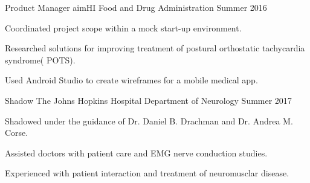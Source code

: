 

\begin{cventries}

  \cventry
    {Product Manager} %
    {aimHI} %
    {Food and Drug Administration} %
    {Summer 2016} %
    {
      \begin{cvitems} %
        \item {Coordinated project scope within a mock start-up environment.}
        \item {Researched solutions for improving treatment of postural orthostatic tachycardia syndrome( POTS).}
        \item {Used Android Studio to create wireframes for a mobile medical app.}
      \end{cvitems}
    }

  \cventry
    {Shadow} %
    {The Johns Hopkins Hospital} %
    {Department of Neurology} %
    {Summer 2017} %
    {
      \begin{cvitems} %
        \item {Shadowed under the guidance of Dr. Daniel B. Drachman and Dr. Andrea M. Corse.}
        \item {Assisted doctors with patient care and EMG nerve conduction studies.}
        \item {Experienced with patient interaction and treatment of neuromusclar disease.}
      \end{cvitems}
    }

\end{cventries}
